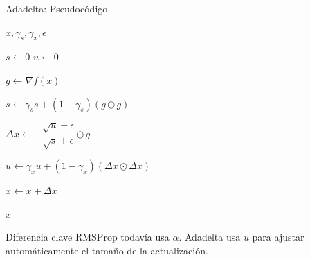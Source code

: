 \begin{frame}{Adadelta: Pseudocódigo}

\footnotesize

\begin{algorithmic}[1]

\Require $x,\gamma_s,\gamma_x,\epsilon$

\State $s\gets0$
\State $u\gets0$


    \State $g\gets\nabla f(x)$

    \State
    $s\gets
    \gamma_s s+(1-\gamma_s)(g\odot g)$

    \State
    $\Delta x\gets
    -\dfrac{\sqrt{u}+\epsilon}
    {\sqrt{s}+\epsilon}\odot g$

    \State
    $u\gets
    \gamma_xu+
    (1-\gamma_x)(\Delta x\odot\Delta x)$

    \State $x\gets x+\Delta x$

\EndWhile

\State \Return $x$

\end{algorithmic}

\vspace{0.25cm}

\begin{block}{Diferencia clave}
RMSProp todavía usa $\alpha$.
Adadelta usa $u$ para ajustar automáticamente
el tamaño de la actualización.
\end{block}

\end{frame}


